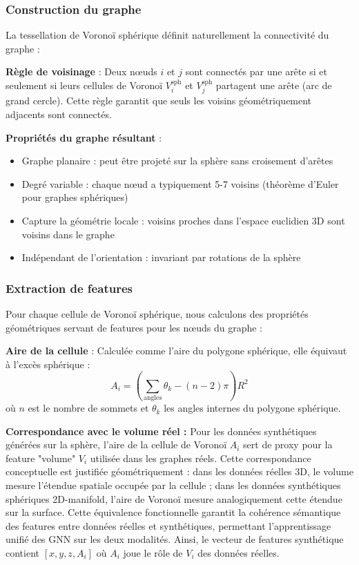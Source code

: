 \subsubsection{Construction du graphe}

La tessellation de Voronoï sphérique définit naturellement la connectivité du graphe :

\textbf{Règle de voisinage} : Deux nœuds $i$ et $j$ sont connectés par une arête si et seulement si leurs cellules de Voronoï $V_i^{\text{sph}}$ et $V_j^{\text{sph}}$ partagent une arête (arc de grand cercle). Cette règle garantit que seuls les voisins géométriquement adjacents sont connectés.

\textbf{Propriétés du graphe résultant} :
\begin{itemize}
    \item Graphe planaire : peut être projeté sur la sphère sans croisement d'arêtes
    \item Degré variable : chaque nœud a typiquement 5-7 voisins (théorème d'Euler pour graphes sphériques)
    \item Capture la géométrie locale : voisins proches dans l'espace euclidien 3D sont voisins dans le graphe
    \item Indépendant de l'orientation : invariant par rotations de la sphère
\end{itemize}

\subsubsection{Extraction de features}

Pour chaque cellule de Voronoï sphérique, nous calculons des propriétés géométriques servant de features pour les nœuds du graphe :

\textbf{Aire de la cellule} : Calculée comme l'aire du polygone sphérique, elle équivaut à l'excès sphérique :
\[
A_i = \left(\sum_{\text{angles}} \theta_k - (n-2)\pi\right) R^2
\]
où $n$ est le nombre de sommets et $\theta_k$ les angles internes du polygone sphérique.

\textbf{Correspondance avec le volume réel :}
Pour les données synthétiques générées sur la sphère, l'aire de la cellule de Voronoï $A_i$ sert de proxy pour la feature "volume" $V_i$ utilisée dans les graphes réels. Cette correspondance conceptuelle est justifiée géométriquement : dans les données réelles 3D, le volume mesure l'étendue spatiale occupée par la cellule ; dans les données synthétiques sphériques 2D-manifold, l'aire de Voronoï mesure analogiquement cette étendue sur la surface. Cette équivalence fonctionnelle garantit la cohérence sémantique des features entre données réelles et synthétiques, permettant l'apprentissage unifié des GNN sur les deux modalités. Ainsi, le vecteur de features synthétique contient $[x, y, z, A_i]$ où $A_i$ joue le rôle de $V_i$ des données réelles.

